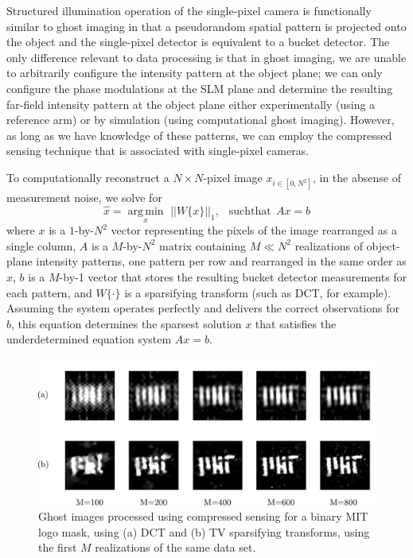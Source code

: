 Structured illumination operation of the single-pixel camera is functionally similar to ghost imaging in that a pseudorandom spatial pattern is projected onto the object and the single-pixel detector is equivalent to a bucket detector. The only difference relevant to data processing is that in ghost imaging, we are unable to arbitrarily configure the intensity pattern at the object plane; we can only configure the phase modulations at the SLM plane and determine the resulting far-field intensity pattern at the object plane either experimentally (using a reference arm) or by simulation (using computational ghost imaging). However, as long as we have knowledge of these patterns, we can employ the compressed sensing technique that is associated with single-pixel cameras.

To computationally reconstruct a $N \times N$-pixel image $x_{i \in [0,N^2]}$, in the absense of measurement noise, we solve for
\begin{equation}
\hat{x} = \underset{x}{\operatorname{arg\,min}}\,\,||W\{x\}||_1,\,\,\, \operatorname{such that}\,Ax = b
\end{equation}
where $x$ is a $1$-by-$N^2$ vector representing the pixels of the image rearranged as a single column, $A$ is a $M$-by-$N^2$ matrix containing $M \ll N^2$ realizations of object-plane intensity patterns, one pattern per row and rearranged in the same order as $x$, $b$ is a $M$-by-1 vector that stores the resulting bucket detector measurements for each pattern, and $W\{\cdot\}$ is a sparsifying transform (such as DCT, for example). Assuming the system operates perfectly and delivers the correct observations for $b$, this equation determines the sparsest solution $x$ that satisfies the underdetermined equation system $Ax = b$.

\begin{figure}[t]
\begin{center}
\includegraphics[width=16cm]{figure-ghost-compressed-dctvstv.pdf}
\caption{Ghost images processed using compressed sensing for a binary MIT logo mask, using (a) DCT and (b) TV sparsifying transforms, using the first $M$ realizations of the same data set.}
\label{figure:ghost-compressed-dctvstv}
\end{center}
\end{figure}


